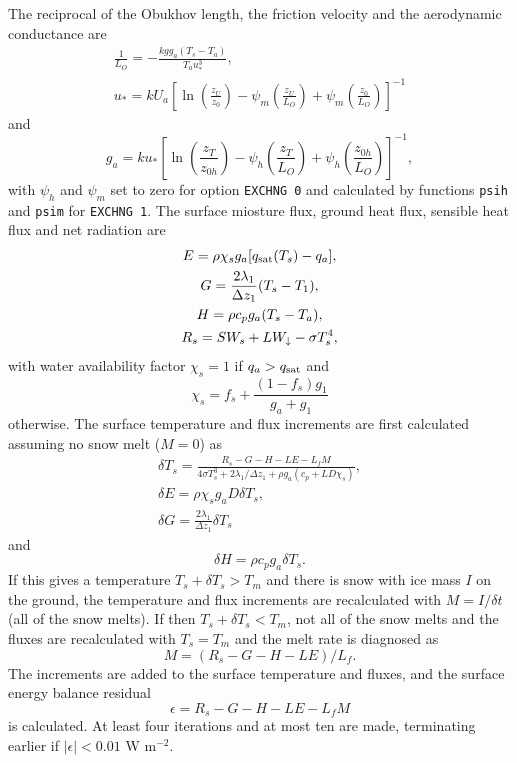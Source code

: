 \documentclass[fleqn]{article}
\begin{document}
The reciprocal of the Obukhov length, the friction velocity and the aerodynamic conductance are
\begin{gather}
\frac{1}{L_O} = - \frac{kgg_a(T_s - T_a)}{T_au_*^3}, \\
u_* = kU_a\left[\ln\left(\frac{z_U}{z_0}\right) -
                \psi_m\left(\frac{z_U}{L_O}\right) + \psi_m\left(\frac{z_0}{L_O}\right)\right]^{-1}
\end{gather}
and
\begin{equation}
g_a = ku_*\left[\ln\left(\frac{z_T}{z_{0h}}\right) -
                \psi_h\left(\frac{z_T}{L_O}\right) + \psi_h\left(\frac{z_{0h}}{L_O}\right)\right]^{-1},
\end{equation}
with $\psi_h$ and $\psi_m$ set to zero for option {\tt EXCHNG 0} and calculated by functions {\tt psih} and {\tt psim} for {\tt EXCHNG 1}. The surface miosture flux, ground heat flux, sensible heat flux and net radiation are 
\begin{gather}
E = \rho\chi_sg_a[q_{\rm sat}(T_s) - q_a], \\
G = \frac{2\lambda_1}{\Delta z_1}(T_s - T_1), \\
H = \rho c_pg_a(T_s - T_a), \\
R_s = SW_s + LW_\downarrow - \sigma T_s^4,
\end{gather}
with water availability factor $\chi_s = 1$ if $q_a > q_{\rm sat}$ and
\begin{equation}
\chi_s = f_s + \frac{(1 - f_s)g_1}{g_a + g_1}
\end{equation}
otherwise. The surface temperature and flux increments are first calculated assuming no snow melt ($M = 0$) as
\begin{gather}
\delta T_s = \frac{R_s - G - H - LE - L_fM}{4\sigma T_s^3 + 2\lambda_1/\Delta z_1 + \rho g_a(c_p + LD\chi_s)}, \\
\delta E = \rho\chi_sg_aD\delta T_s, \\
\delta G = \frac{2\lambda_1}{\Delta z_1}\delta T_s
\end{gather}
and
\begin{equation}
\delta H = \rho c_pg_a\delta T_s.
\end{equation}
If this gives a temperature $T_s + \delta T_s > T_m$ and there is snow with ice mass $I$ on the ground, the temperature and flux increments are recalculated with $M = I / \delta t$ (all of the snow melts). If then $T_s + \delta T_s < T_m$, not all of the snow melts and the fluxes are recalculated with $T_s = T_m$ and the melt rate is diagnosed as
\begin{equation}
M =  (R_s - G - H - LE)/L_f.
\end{equation}
The increments are added to the surface temperature and fluxes, and the surface energy balance residual
\begin{equation}
\epsilon =  R_s - G - H - LE - L_fM
\end{equation}
is calculated. At least four iterations and at most ten are made, terminating earlier if $|\epsilon | < 0.01$ W m$^{-2}$.
\end{document}
